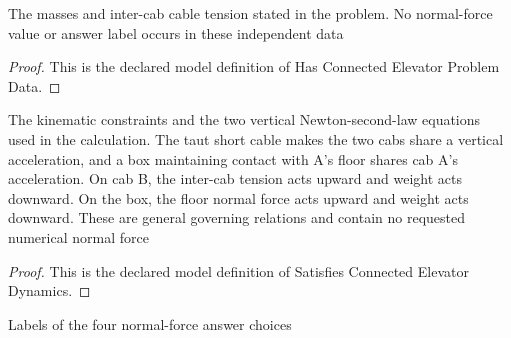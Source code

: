 \begin{definition}
  \label{def:physics:phyx-mini-0762:phyxminiproblems-problemphyxmini0762-hasconnectedelevatorproblemdata}
  The masses and inter-cab cable tension stated in the problem. No normal-force value or answer label occurs in these independent data
\end{definition}
\begin{proof}
  This is the declared model definition of Has Connected Elevator Problem Data.
\end{proof}
\begin{definition}
  \label{def:physics:phyx-mini-0762:phyxminiproblems-problemphyxmini0762-satisfiesconnectedelevatordynamics}
  The kinematic constraints and the two vertical Newton-second-law equations used in the calculation. The taut short cable makes the two cabs share a vertical acceleration, and a box maintaining contact with A's floor shares cab A's acceleration. On cab B, the inter-cab tension acts upward and weight acts downward. On the box, the floor normal force acts upward and weight acts downward. These are general governing relations and contain no requested numerical normal force
\end{definition}
\begin{proof}
  This is the declared model definition of Satisfies Connected Elevator Dynamics.
\end{proof}
\begin{definition}
  \label{def:physics:phyx-mini-0762:phyxminiproblems-problemphyxmini0762-normalforceanswerchoice}
  Labels of the four normal-force answer choices
\end{definition}

